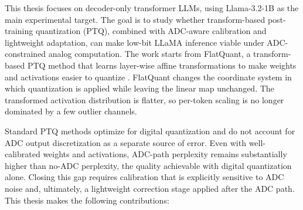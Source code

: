 \documentclass[a4paper,11pt,oneside]{article}
\theoremstyle{breakstyle}
\begin{document}
This thesis focuses on decoder-only transformer LLMs,
using Llama-3.2-1B as the main experimental target. The goal is to study
whether transform-based post-training quantization (PTQ), combined with
ADC-aware calibration and lightweight adaptation, can make low-bit
LLaMA inference viable under ADC-constrained analog computation. The
work starts from FlatQuant, a transform-based PTQ method that learns
layer-wise affine transformations to make weights and activations easier
to quantize \cite{FlatQuant2024}. FlatQuant changes the coordinate
system in which quantization is applied while leaving the linear map
unchanged. The transformed activation distribution is flatter, so
per-token scaling is no longer dominated by a few outlier channels.

Standard PTQ methods optimize for digital quantization and do not account
for ADC output discretization as a separate source of error. Even with
well-calibrated weights and activations, ADC-path perplexity remains
substantially higher than no-ADC perplexity, the quality achievable
with digital quantization alone. Closing this gap requires calibration
that is explicitly sensitive to ADC noise and, ultimately, a lightweight
correction stage applied after the ADC path.
This thesis makes the following contributions:
\end{document}
